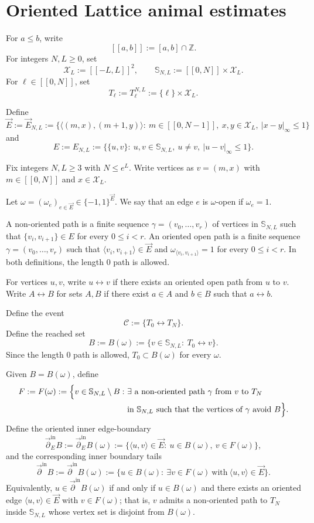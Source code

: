\documentclass[11pt]{amsart}
\author{Anonymous}
\theoremstyle{definition}
\numberwithin{equation}{section}
\newcommand{\Zbb}{\mathbb{Z}}
\newcommand{\Sbb}{\mathbb{S}}
\newcommand{\mrm}[1]{\mathrm{#1}}
\newcommand{\1}{\mathbbm{1}}
\newcommand{\arrow}[1]{\overrightarrow{#1}}
\newcommand{\arpartial}{\arrow{\partial}}
\newcommand{\Chi}{\mathcal{X}}
\begin{document}
\section{Oriented Lattice animal estimates}

For $a\le b$, write
\[
[\![a,b]\!]:=[a,b]\cap \Zbb.
\]
For integers $N,L\ge 0$, set
\[
\Chi_L:=[\![-L,L]\!]^2,
\qquad
\Sbb_{N,L}:=[\![0,N]\!]\times \Chi_L.
\]
For $\ell\in[\![0,N]\!]$, set
\[
T_\ell:= T_\ell^{N,L}:=\{\ell\}\times \Chi_L.
\]

Define
\[
\arrow{E}:=\arrow{E}_{N,L}
:=
\bigl\{\langle (m,x),(m+1,y)\rangle:\ 
m\in[\![0,N-1]\!],\ x,y\in\Chi_L,\ |x-y|_\infty \le 1
\bigr\}
\]
and
\[
E:= E_{N,L}
:=
\bigl\{\{u,v\}:\ u,v\in\Sbb_{N,L},\ u\ne v,\ |u-v|_\infty\le 1\bigr\}.
\]

Fix integers $N,L\ge 3$ with $N\le e^L$.
Write vertices as $v=(m,x)$ with $m\in[\![0,N]\!]$ and $x\in\Chi_L$.

Let $\omega=(\omega_e)_{e\in \arrow{E}}\in\{-1,1\}^{\arrow{E}}$. We say that an edge $e$ is $\omega$-open if $\omega_e=1$.

A non-oriented path is a finite sequence $\gamma=(v_0,\dots,v_r)$ of vertices in $\Sbb_{N,L}$ such that $\{v_i,v_{i+1}\}\in E$ for every $0\le i<r$. An oriented open path is a finite sequence $\gamma=(v_0,\dots,v_r)$ such that $\langle v_i,v_{i+1}\rangle\in \arrow{E}$ and $\omega_{\langle v_i,v_{i+1}\rangle}=1$ for every $0\le i<r$. In both definitions, the length $0$ path is allowed.

For vertices $u,v$, write $u\leftrightarrow v$ if there exists an oriented open path from $u$ to $v$. Write $A\leftrightarrow B$ for sets $A,B$ if there exist $a\in A$ and $b\in B$ such that $a\leftrightarrow b$.

Define the event
\[
\mathcal C:=\{T_0\leftrightarrow T_N\}.
\]
Define the reached set
\[
B:=B(\omega):=\{v\in \Sbb_{N,L}:\ T_0\leftrightarrow v\}.
\]
Since the length $0$ path is allowed, $T_0\subset B(\omega)$ for every $\omega$.


Given $B=B(\omega)$, define
\[
\begin{aligned}
F:=F(\omega):=\Bigl\{v\in \Sbb_{N,L}\setminus B:\ &
\exists \text{ a non-oriented path }\gamma\text{ from }v\text{ to } T_{N}\\
&\text{in }\Sbb_{N,L}\text{ such that the vertices of }\gamma\text{ avoid }B\Bigr\}.
\end{aligned}
\]
Define the oriented inner edge-boundary
\[
\arpartial^{\mrm{in}}_E B:=\arpartial_E^{\mrm{in}} B(\omega):=\{\langle u,v\rangle\in \arrow{E}:\ u\in B(\omega),\ v\in F(\omega)\},
\]
and the corresponding inner boundary tails
\[
\arpartial^{\mrm{in}} B:=\arpartial^{\mrm{in}} B(\omega):=\{u\in B(\omega):\ \exists v\in F(\omega)\ \text{with}\ \langle u,v\rangle\in \arrow{E}\}.
\]
Equivalently, $u\in\arpartial^{\mrm{in}} B(\omega)$ if and only if
$u\in B(\omega)$ and there exists an oriented edge
$\langle u,v\rangle\in \arrow{E}$ with $v\in F(\omega)$; that is,
$v$ admits a non-oriented path to $T_N$ inside
$\Sbb_{N,L}$ whose vertex set is disjoint from $B(\omega)$.
\end{document}
